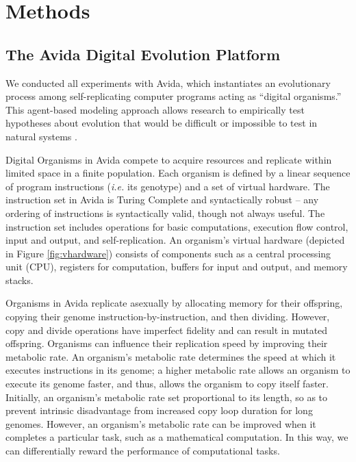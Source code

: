 \section{Methods} \label{sec:methods}



\subsection{The Avida Digital Evolution Platform}
We conducted all experiments with Avida, which instantiates an evolutionary process among self-replicating computer programs acting as ``digital organisms.''
This agent-based modeling approach allows research to empirically test hypotheses about evolution that would be difficult or impossible to test in natural systems \citep{Ofria:2009avida}.



\noindent
Digital Organisms in Avida compete to acquire resources and replicate within limited space in a finite population.
Each organism is defined by a linear sequence of program instructions (\textit{i.e.} its genotype) and a set of virtual hardware. The instruction set in Avida is Turing Complete and syntactically robust -- any ordering of instructions is syntactically valid, though not always useful. The instruction set includes operations for basic computations, execution flow control, input and output, and self-replication. An organism's virtual hardware (depicted in Figure \ref{fig:vhardware}) consists of components such as a central processing unit (CPU), registers for computation, buffers for input and output, and memory stacks.

Organisms in Avida replicate asexually by allocating memory for their offspring, copying their genome instruction-by-instruction, and then dividing. However, copy and divide operations have imperfect fidelity and can result in mutated offspring. Organisms can influence their replication speed by improving their metabolic rate. An organism's metabolic rate determines the speed at which it executes instructions in its genome; a higher metabolic rate allows an organism to execute its genome faster, and thus, allows the organism to copy itself faster. Initially, an organism's metabolic rate set proportional to its length, so as to prevent intrinsic disadvantage from increased copy loop duration for long genomes. However, an organism's metabolic rate can be improved when it completes a particular task, such as a mathematical computation. In this way, we can differentially reward the performance of computational tasks.

